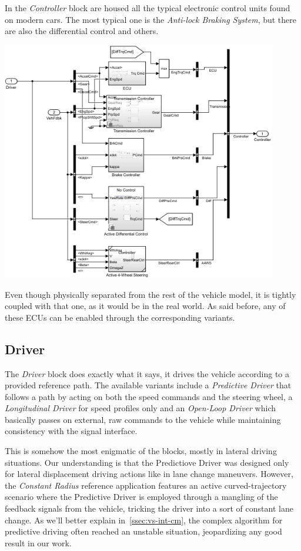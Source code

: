 		In the \emph{Controller} block are housed all the typical electronic control units found on modern cars. The most typical one is the \emph{Anti-lock Braking System},
		but there are also the differential control and others.
		\begin{center}
			\includegraphics[width=0.9\textwidth]{Images/Simulator/ctrl-full}
		\end{center}

		Even though physically separated from the rest of the vehicle model, it is tightly coupled with that one, as it would be in the real world. As said before, any of these ECUs
		can be enabled through the corresponding variants.

		\subsection{Driver}
		\label{ssec:vs-env-drv}

		The \emph{Driver} block does exactly what it says, it drives the vehicle according to a provided reference path.
		The available variants include a \emph{Predictive Driver} that follows a path by acting on both the speed commands and the steering wheel,
		a \emph{Longitudinal Driver} for speed profiles only and an \emph{Open-Loop Driver} which basically passes on external, raw commands to the vehicle
		while maintaining consistency with the signal interface.

		This is somehow the most enigmatic of the blocks, mostly in lateral driving situations. Our understanding is that the Predictiove Driver was designed only for
		lateral displacement driving actions like in lane change maneuvers. However, the \emph{Constant Radius} reference application features an active curved-trajectory
		scenario where the Predictive Driver is employed through a mangling of the feedback signals from the vehicle, tricking the driver into a sort of constant lane change. As
		we'll better explain in~\vref{ssec:vs-int-cm}, the complex algorithm for predictive driving often reached an unstable situation, jeopardizing any good result in our work.


